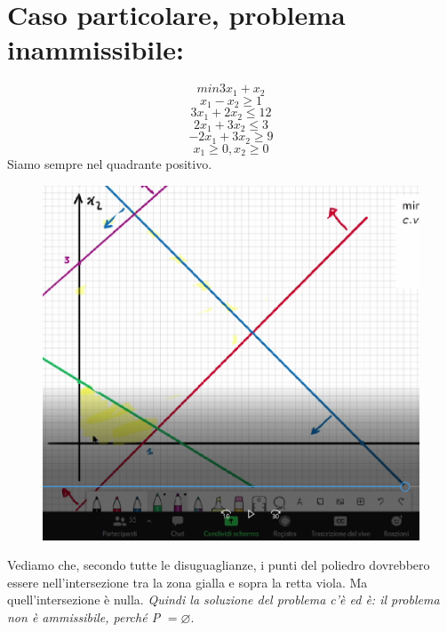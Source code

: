 \newpage

\section{Caso particolare, problema inammissibile:}
\begin{equation*}
    min 3x_1 + x_2
\end{equation*}
\begin{equation*}
    x_1 - x_2 \geq 1
\end{equation*}
\begin{equation*}
    3x_1 + 2x_2 \leq 12
\end{equation*}
\begin{equation*}
    2x_1 + 3x_2 \leq 3
\end{equation*}
\begin{equation*}
    -2x_1 + 3x_2 \geq 9
\end{equation*}
\begin{equation*}
    x_1 \geq 0, x_2 \geq 0
\end{equation*}
Siamo sempre nel quadrante positivo.
\begin{figure}[h!]
    \centering
    \includegraphics[scale=0.5]{okok.png}
\end{figure}
Vediamo che, secondo tutte le disuguaglianze, i punti del poliedro dovrebbero essere nell'intersezione tra la zona gialla e sopra la retta viola. Ma quell'intersezione è nulla. \textit{Quindi la soluzione del problema c'è ed è: il problema non è ammissibile, perché P} $= \varnothing$.






